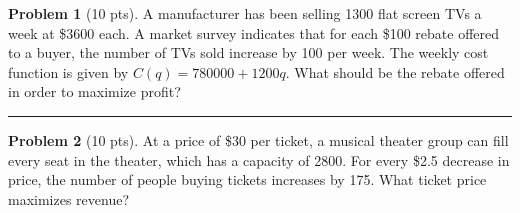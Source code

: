 \documentclass[12pt]{article}
\theoremstyle{definition}
\newtheorem{problem}{Problem}
\begin{document}
\bigskip


\begin{problem}[10 pts]
  A manufacturer has been selling 1300 flat screen TVs a week at \$3600 each.  A market survey indicates that for each
  \$100 rebate offered to a buyer, the number of TVs sold increase by 100 per week.  The weekly cost function is given
  by $C(q) = 780000 + 1200q$.  What should be the rebate offered in order to maximize profit?
\end{problem}
\vspace{14cm}
\hrule

\begin{problem}[10 pts]
At a price of \$30 per ticket, a musical theater group can fill every seat in the theater, which has a capacity of 2800.  For every \$2.5 decrease in price, the number of people buying tickets increases by 175.  What ticket price maximizes revenue?
\end{problem}
\end{document}
